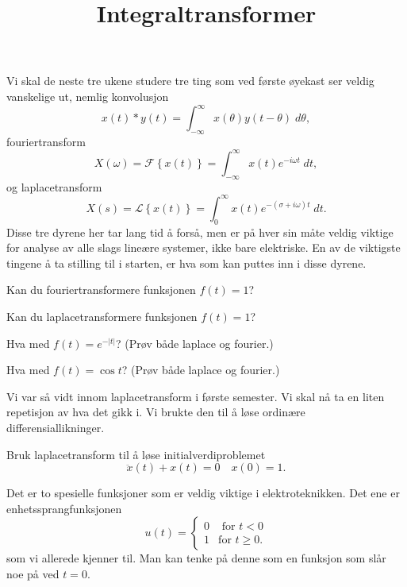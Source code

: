 \documentclass[a4paper,norsk,11pt]{interaktiv}
\title{Integraltransformer}
\begin{document}

\maketitle


Vi skal de neste tre ukene studere tre ting som ved første øyekast ser veldig vanskelige ut,
nemlig konvolusjon
\[
x(t)\ast y(t) = \int_{-\infty}^{\infty} x(\theta) y(t-\theta)\; d\theta,
\]
fouriertransform
\[
X(\omega) = \mathcal{F}\left\{ x(t) \right\}=\int_{-\infty}^{\infty} x(t)e^{-i\omega t}\;dt,
\]
og laplacetransform
\[
X(s) = \mathcal{L}\left\{ x(t) \right\}=\int_0^{\infty} x(t)e^{-(\sigma + i \omega)t}\; dt.
\]
Disse tre dyrene her tar lang tid å forså, 
men er på hver sin måte veldig viktige for analyse av alle slags lineære systemer, 
ikke bare elektriske.
En av de viktigste tingene å ta stilling til i starten,
er hva som kan puttes inn i disse dyrene. 

\begin{oppgave}{1}
Kan du fouriertransformere funksjonen $f(t)=1$?
\end{oppgave}

\begin{oppgave}{2}
Kan du laplacetransformere funksjonen $f(t)=1$?
\end{oppgave}

\begin{oppgave}{3}
Hva med $f(t)=e^{-|t|}$? (Prøv både laplace og fourier.)
\end{oppgave}

\begin{oppgave}{4}
Hva med $f(t)=\cos t$? (Prøv både laplace og fourier.)
\end{oppgave}


Vi var så vidt innom laplacetransform i første semester. 
Vi skal nå ta en liten repetisjon av hva det gikk i.
Vi brukte den til å løse ordinære differensiallikninger.

\begin{oppgave}{5}
Bruk laplacetransform til å løse initialverdiproblemet
\[
\ddot{x}(t)+x(t)=0 \quad x(0)=1.
\]
\end{oppgave}


Det er to spesielle funksjoner som er veldig viktige i elektroteknikken. 
Det ene er enhetssprangfunksjonen
\[
u(t)= \left\{ 
\begin{array}{ll}
0 & \mbox{ for } t<0\\
1 & \mbox{for } t\geq 0.
\end{array}
\right.
\]
som vi allerede kjenner til.
Man kan tenke på denne som en funksjon som slår noe på ved $t=0$. 
 \begin{center}
  \end{center}
\end{document}
